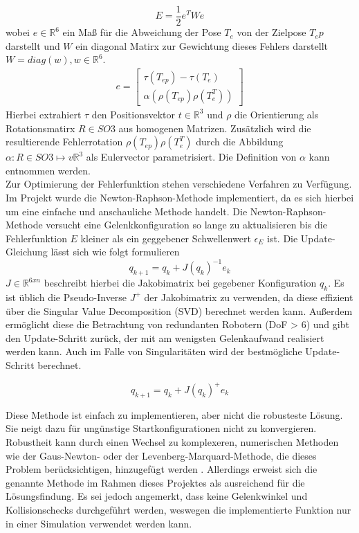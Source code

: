 \begin{equation}
    E=\frac{1}{2}e^TWe
\end{equation}
wobei $e \in \mathbb{R}^6$ ein Maß für die Abweichung der Pose $T_e$ von der Zielpose $T_ep$ darstellt und $W$ ein diagonal Matirx zur Gewichtung dieses Fehlers darstellt $W = diag(w), w \in \mathbb{R}^6$.
\begin{gather}
    e=
    \begin{bmatrix} 
    \tau(T_{ep}) - \tau(T_{e})\\
    \alpha(\rho(T_{ep}) \rho(T_{e}^T))
    \end{bmatrix} 
\end{gather}
Hierbei extrahiert $\tau$ den Positionsvektor $t \in \mathbb{R}^3$ und $\rho$ die Orientierung als Rotationsmatirx $R \in SO3$ aus homogenen Matrizen. Zusätzlich wird die resultierende Fehlerrotation $\rho(T_{ep}) \rho(T_{e}^T)$ durch die Abbildung $\alpha: R \in SO3 \mapsto v \mathbb{R}^3$ als Eulervector parametrisiert. Die Definition von $\alpha$ kann \cite{corke2024} entnommen werden.\\

Zur Optimierung der Fehlerfunktion stehen verschiedene Verfahren zu Verfügung. Im Projekt wurde die Newton-Raphson-Methode implementiert, da es sich hierbei um eine einfache und anschauliche Methode handelt. Die Newton-Raphson-Methode versucht eine Gelenkkonfiguration so lange zu aktualisieren bis die Fehlerfunktion $E$ kleiner als ein geggebener Schwellenwert $\epsilon_E$ ist. Die Update-Gleichung lässt sich wie folgt formulieren
\begin{equation}
    q_{k+1} = q_{k} + J(q_{k})^{-1} e_k
\end{equation}
$J \in \mathbb{R}^{6xn}$ beschreibt hierbei die Jakobimatrix bei gegebener Konfiguration $q_k$. Es ist üblich die Pseudo-Inverse $J^+$ der Jakobimatrix zu verwenden, da diese effizient über die Singular Value Decomposition (SVD) berechnet werden kann. Außerdem ermöglicht diese die Betrachtung von redundanten Robotern (DoF > 6) und gibt den Update-Schritt zurück, der mit am wenigsten Gelenkaufwand realisiert werden kann. Auch im Falle von Singularitäten wird der bestmögliche Update-Schritt berechnet.

\begin{equation}
q_{k+1} = q_{k} + J(q_{k})^{+} e_k
\end{equation}

Diese Methode ist einfach zu implementieren, aber nicht die robusteste Lösung. Sie neigt dazu für ungünstige Startkonfigurationen nicht zu konvergieren. Robustheit kann durch einen Wechsel zu komplexeren, numerischen Methoden wie der Gaus-Newton- oder der Levenberg-Marquard-Methode, die dieses Problem berücksichtigen, hinzugefügt werden
\cite{corke2024}\cite{Arteaga2022}\cite{corke2020}. Allerdings erweist sich die genannte Methode im Rahmen dieses Projektes als ausreichend für die Lösungsfindung. Es sei jedoch angemerkt, dass keine Gelenkwinkel und Kollisionschecks durchgeführt werden, weswegen die implementierte Funktion nur in einer Simulation verwendet werden kann.

